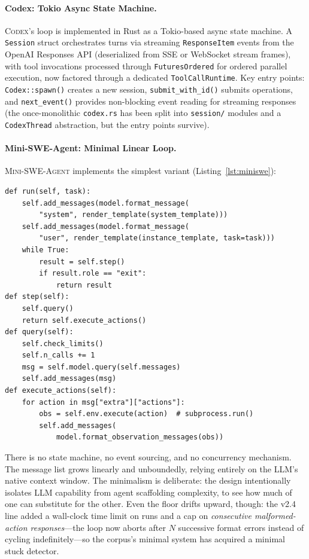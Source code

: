 \documentclass[11pt,a4paper]{article}
\newcommand{\cdx}{\textsc{Codex}\xspace}
\newcommand{\mswe}{\textsc{Mini-SWE-Agent}\xspace}
\begin{document}
\paragraph{Codex: Tokio Async State Machine.}
\cdx{}'s loop is implemented in Rust as a Tokio-based async state machine.
A \texttt{Session} struct orchestrates turns via streaming \texttt{ResponseItem} events from the OpenAI Responses API (deserialized from SSE or WebSocket stream frames), with tool invocations processed through \texttt{FuturesOrdered} for ordered parallel execution, now factored through a dedicated \texttt{ToolCallRuntime}.
Key entry points: \texttt{Codex::spawn()} creates a new session, \texttt{submit\_with\_id()} submits operations, and \texttt{next\_event()} provides non-blocking event reading for streaming responses (the once-monolithic \texttt{codex.rs} has been split into \texttt{session/} modules and a \texttt{CodexThread} abstraction, but the entry points survive).

\paragraph{Mini-SWE-Agent: Minimal Linear Loop.}
\mswe{} implements the simplest variant (Listing~\ref{lst:miniswe}):

\begin{lstlisting}[caption={\mswe{} agent loop (condensed; omits format-error handling, cost/time accounting, and trajectory saving present in v2.4.5).},label={lst:miniswe}]
def run(self, task):
    self.add_messages(model.format_message(
        "system", render_template(system_template)))
    self.add_messages(model.format_message(
        "user", render_template(instance_template, task=task)))
    while True:
        result = self.step()
        if result.role == "exit":
            return result
def step(self):
    self.query()
    return self.execute_actions()
def query(self):
    self.check_limits()
    self.n_calls += 1
    msg = self.model.query(self.messages)
    self.add_messages(msg)
def execute_actions(self):
    for action in msg["extra"]["actions"]:
        obs = self.env.execute(action)  # subprocess.run()
        self.add_messages(
            model.format_observation_messages(obs))
\end{lstlisting}

There is no state machine, no event sourcing, and no concurrency mechanism.
The message list grows linearly and unboundedly, relying entirely on the LLM's native context window.
The minimalism is deliberate: the design intentionally isolates LLM capability from agent scaffolding complexity, to see how much of one can substitute for the other.
Even the floor drifts upward, though: the v2.4 line added a wall-clock time limit on runs and a cap on \emph{consecutive malformed-action responses}---the loop now aborts after $N$ successive format errors instead of cycling indefinitely---so the corpus's minimal system has acquired a minimal stuck detector.
\end{document}
